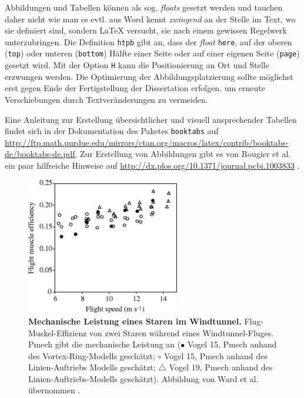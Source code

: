 \documentclass{scrreprt}
\begin{document}
Abbildungen und Tabellen können als sog. \textit{floats} gesetzt werden und tauchen daher nicht wie man es evtl. aus Word kennt \textit{zwingend} an der Stelle im Text, wo sie definiert sind, sondern LaTeX versucht, sie nach einem gewissen Regelwerk unterzubringen. Die Definition \verb|htpb| gibt an, dass der \textit{float} \verb|here|, auf der oberen (\verb|top|) oder unteren (\verb|bottom|) Hälfte einer Seite oder auf einer eigenen Seite (\verb|page|) gesetzt wird. Mit der Option \verb|H| kann die Positionierung an Ort und Stelle erzwungen werden. Die Optimierung der Abbildungsplatzierung sollte möglichst erst gegen Ende der Fertigstellung der Dissertation erfolgen, um erneute Verschiebungen durch Textveränderungen zu vermeiden. 

Eine Anleitung zur Erstellung übersichtlicher und visuell ansprechender Tabellen findet sich in der Dokumentation des Paketes \verb|booktabs| auf \url{http://ftp.math.purdue.edu/mirrors/ctan.org/macros/latex/contrib/booktabs-de/booktabs-de.pdf}. Zur Erstellung von Abbildungen gibt es von Rougier et al. ein paar hilfreiche Hinweise auf \url{http://dx.plos.org/10.1371/journal.pcbi.1003833} \cite{Rougier2014}. 
\vspace*{0.6cm}

\begin{figure}[htpb] %
	{\centering
		\includegraphics[height=6cm]{abbildungen/Starling_Mechpower.jpg} 
		\caption[Mechanische Leistung eines Staren im Windtunnel]{
			\textbf{Mechanische Leistung eines Staren im Windtunnel.} 
			Flug-Muskel-Effizienz von zwei Staren während eines Windtunnel-Fluges. Pmech gibt die mechanische Leistung an ($\bullet$ Vogel 15, Pmech anhand des Vortex-Ring-Modells geschätzt; $\circ$ Vogel 15, Pmech anhand des Linien-Auftriebs Modells geschätzt; $\triangle$ Vogel 19, Pmech anhand des Linien-Auftriebs-Modells geschätzt). Abbildung von Ward et al. übernommen  \cite{Ward2001}.
			}
		\label{fig:beispielabbildung}
	}
\end{figure}
\end{document}
